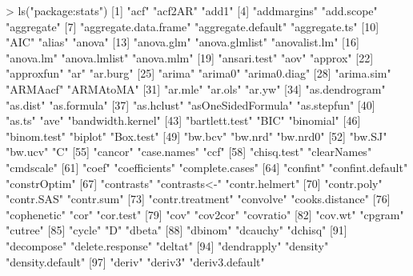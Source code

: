 \documentclass[tutorial.tex]{subfiles}
\begin{document}
\begin{Schunk}
\begin{Soutput}
> ls("package:stats")
  [1] "acf"                  "acf2AR"               "add1"                
  [4] "addmargins"           "add.scope"            "aggregate"           
  [7] "aggregate.data.frame" "aggregate.default"    "aggregate.ts"        
 [10] "AIC"                  "alias"                "anova"               
 [13] "anova.glm"            "anova.glmlist"        "anovalist.lm"        
 [16] "anova.lm"             "anova.lmlist"         "anova.mlm"           
 [19] "ansari.test"          "aov"                  "approx"              
 [22] "approxfun"            "ar"                   "ar.burg"             
 [25] "arima"                "arima0"               "arima0.diag"         
 [28] "arima.sim"            "ARMAacf"              "ARMAtoMA"            
 [31] "ar.mle"               "ar.ols"               "ar.yw"               
 [34] "as.dendrogram"        "as.dist"              "as.formula"          
 [37] "as.hclust"            "asOneSidedFormula"    "as.stepfun"          
 [40] "as.ts"                "ave"                  "bandwidth.kernel"    
 [43] "bartlett.test"        "BIC"                  "binomial"            
 [46] "binom.test"           "biplot"               "Box.test"            
 [49] "bw.bcv"               "bw.nrd"               "bw.nrd0"             
 [52] "bw.SJ"                "bw.ucv"               "C"                   
 [55] "cancor"               "case.names"           "ccf"                 
 [58] "chisq.test"           "clearNames"           "cmdscale"            
 [61] "coef"                 "coefficients"         "complete.cases"      
 [64] "confint"              "confint.default"      "constrOptim"         
 [67] "contrasts"            "contrasts<-"          "contr.helmert"       
 [70] "contr.poly"           "contr.SAS"            "contr.sum"           
 [73] "contr.treatment"      "convolve"             "cooks.distance"      
 [76] "cophenetic"           "cor"                  "cor.test"            
 [79] "cov"                  "cov2cor"              "covratio"            
 [82] "cov.wt"               "cpgram"               "cutree"              
 [85] "cycle"                "D"                    "dbeta"               
 [88] "dbinom"               "dcauchy"              "dchisq"              
 [91] "decompose"            "delete.response"      "deltat"              
 [94] "dendrapply"           "density"              "density.default"     
 [97] "deriv"                "deriv3"               "deriv3.default"      

\end{Soutput}
\end{Schunk}
\end{document}
